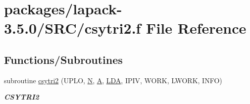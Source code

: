 \hypertarget{csytri2_8f}{}\section{packages/lapack-\/3.5.0/\+S\+R\+C/csytri2.f File Reference}
\label{csytri2_8f}
\subsection*{Functions/\+Subroutines}
\begin{DoxyCompactItemize}
\item 
subroutine \hyperlink{group__complexSYcomputational_ga2d7c0e6bd15ea0feb3e19156fd6222ef}{csytri2} (U\+P\+L\+O, \hyperlink{polmisc_8c_a0240ac851181b84ac374872dc5434ee4}{N}, \hyperlink{classA}{A}, \hyperlink{example__user_8c_ae946da542ce0db94dced19b2ecefd1aa}{L\+D\+A}, I\+P\+I\+V, W\+O\+R\+K, L\+W\+O\+R\+K, I\+N\+F\+O)
\begin{DoxyCompactList}\small\item\em {\bfseries C\+S\+Y\+T\+R\+I2} \end{DoxyCompactList}\end{DoxyCompactItemize}

